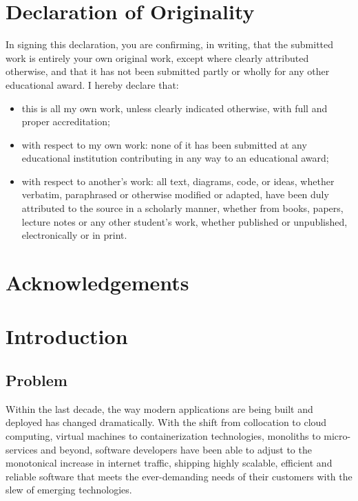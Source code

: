 \documentclass[12pt,pdftex,titlepage]{report}
\begin{document}
    \chapter*{Declaration of Originality}
        In signing this declaration, you are confirming, in writing, that the submitted work
        is entirely your own original work, except where clearly attributed otherwise, and
        that it has not been submitted partly or wholly for any other educational award. I
        hereby declare that:
        \begin{itemize}
            \item this is all my own work, unless clearly indicated otherwise, with full and proper accreditation;  
            \item with respect to my own work: none of it has been submitted at any educational institution contributing in any way to an educational award;
            \item with respect to another’s work: all text, diagrams, code, or ideas, whether verbatim, paraphrased or otherwise modified or adapted, 
            have been duly attributed to the source in a scholarly manner, whether from books, papers, lecture notes or any other student’s work, whether
            published or unpublished, electronically or in print.
        \end{itemize}

    \chapter*{Acknowledgements}
        
    \tableofcontents

    \chapter{Introduction}
    \setcounter{page}{1}
        \section{Problem}
            Within the last decade, the way modern applications are being built and deployed has changed dramatically. With the shift from collocation to cloud computing,
            virtual machines to containerization technologies, monoliths to micro-services and beyond, software developers have been able to adjust to 
            the monotonical increase in internet traffic, shipping highly scalable, efficient and reliable software that meets the ever-demanding needs of their customers
            with the slew of emerging technologies.
\end{document}
